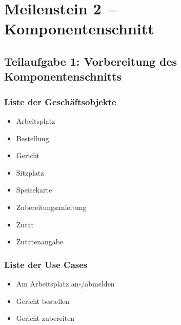 \section{Meilenstein 2 $-$ Komponentenschnitt}

\subsection{Teilaufgabe 1: Vorbereitung des Komponentenschnitts}

\subsubsection{Liste der Gesch\"aftsobjekte}

\begin{itemize}

  \item Arbeitsplatz

  \item Bestellung

  \item Gericht

  \item Sitzplatz

  \item Speisekarte

  \item Zubereitungsanleitung

  \item Zutat

  \item Zutatenangabe

\end{itemize}

\subsubsection{Liste der Use Cases}

\begin{itemize}

  \item Am Arbeitsplatz an-/abmelden

  \item Gericht bestellen

  \item Gericht zubereiten

\end{itemize}

